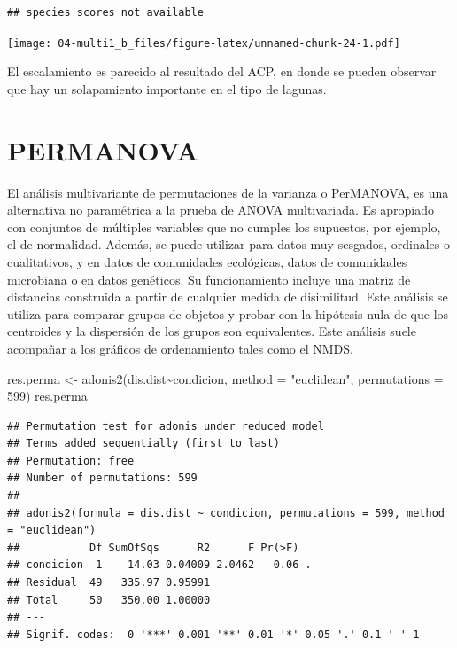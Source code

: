 \documentclass[
]{book}
\newenvironment{Shaded}{\begin{snugshade}}{\end{snugshade}}
\newcommand{\AttributeTok}[1]{\textcolor[rgb]{0.77,0.63,0.00}{#1}}
\newcommand{\DecValTok}[1]{\textcolor[rgb]{0.00,0.00,0.81}{#1}}
\newcommand{\FunctionTok}[1]{\textcolor[rgb]{0.00,0.00,0.00}{#1}}
\newcommand{\NormalTok}[1]{#1}
\newcommand{\OtherTok}[1]{\textcolor[rgb]{0.56,0.35,0.01}{#1}}
\newcommand{\SpecialCharTok}[1]{\textcolor[rgb]{0.00,0.00,0.00}{#1}}
\newcommand{\StringTok}[1]{\textcolor[rgb]{0.31,0.60,0.02}{#1}}
\begin{document}
\begin{verbatim}
## species scores not available
\end{verbatim}

\texttt{[image: 04-multi1\_b\_files/figure-latex/unnamed-chunk-24-1.pdf]}

El escalamiento es parecido al resultado del ACP, en donde se pueden observar que hay un solapamiento importante en el tipo de lagunas.

\hypertarget{permanova}{%
\section{PERMANOVA}\label{permanova}}

El análisis multivariante de permutaciones de la varianza o PerMANOVA, es una alternativa no paramétrica a la prueba de ANOVA multivariada. Es apropiado con conjuntos de múltiples variables que no cumples los supuestos, por ejemplo, el de normalidad. Además, se puede utilizar para datos muy sesgados, ordinales o cualitativos, y en datos de comunidades ecológicas, datos de comunidades microbiana o en datos genéticos. Su funcionamiento incluye una matriz de distancias construida a partir de cualquier medida de disimilitud. Este análisis se utiliza para comparar grupos de objetos y probar con la hipótesis nula de que los centroides y la dispersión de los grupos son equivalentes. Este análisis suele acompañar a los gráficos de ordenamiento tales como el NMDS.

\begin{Shaded}
\begin{Highlighting}[]
\NormalTok{res.perma }\OtherTok{\textless{}{-}} \FunctionTok{adonis2}\NormalTok{(dis.dist}\SpecialCharTok{\textasciitilde{}}\NormalTok{condicion, }\AttributeTok{method =} \StringTok{"euclidean"}\NormalTok{, }\AttributeTok{permutations =} \DecValTok{599}\NormalTok{)}
\NormalTok{res.perma}
\end{Highlighting}
\end{Shaded}

\begin{verbatim}
## Permutation test for adonis under reduced model
## Terms added sequentially (first to last)
## Permutation: free
## Number of permutations: 599
## 
## adonis2(formula = dis.dist ~ condicion, permutations = 599, method = "euclidean")
##           Df SumOfSqs      R2      F Pr(>F)  
## condicion  1    14.03 0.04009 2.0462   0.06 .
## Residual  49   335.97 0.95991                
## Total     50   350.00 1.00000                
## ---
## Signif. codes:  0 '***' 0.001 '**' 0.01 '*' 0.05 '.' 0.1 ' ' 1
\end{verbatim}
\end{document}
